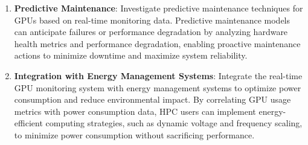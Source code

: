 \begin{enumerate}
    \item \textbf{Predictive Maintenance}: Investigate predictive maintenance techniques for GPUs based on real-time monitoring data. Predictive maintenance models can anticipate failures or performance degradation by analyzing hardware health metrics and performance degradation, enabling proactive maintenance actions to minimize downtime and maximize system reliability.
    \item \textbf{Integration with Energy Management Systems}: Integrate the real-time GPU monitoring system with energy management systems to optimize power consumption and reduce environmental impact. By correlating GPU usage metrics with power consumption data, HPC users can implement energy-efficient computing strategies, such as dynamic voltage and frequency scaling, to minimize power consumption without sacrificing performance.
\end{enumerate}
